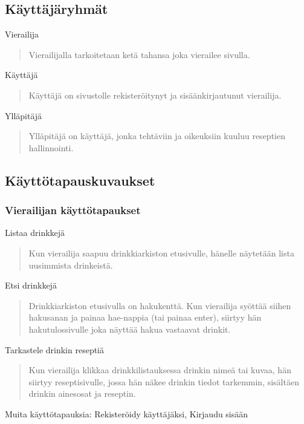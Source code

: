 \documentclass[a4paper]{article}
\begin{document}
\subsection{Käyttäjäryhmät}
Vierailija
\begin{quote}
  Vierailijalla tarkoitetaan ketä tahansa joka vierailee sivulla.
\end{quote}
Käyttäjä
\begin{quote}
  Käyttäjä on sivustolle rekisteröitynyt ja sisäänkirjautunut vierailija.
\end{quote}
Ylläpitäjä
\begin{quote}
  Ylläpitäjä on käyttäjä, jonka tehtäviin ja oikeuksiin kuuluu reseptien hallinnointi.
\end{quote}

\subsection{Käyttötapauskuvaukset}
\subsubsection{Vierailijan käyttötapaukset}
Listaa drinkkejä
\begin{quote}
  Kun vierailija saapuu drinkkiarkiston etusivulle, hänelle näytetään lista uusimmista drinkeistä.
\end{quote}
Etsi drinkkejä
\begin{quote}
  Drinkkiarkiston etusivulla on hakukenttä. Kun vierailija syöttää siihen hakusanan ja painaa hae-nappia (tai painaa enter), siirtyy hän hakutulossivulle joka näyttää hakua vastaavat drinkit.
\end{quote}
Tarkastele drinkin reseptiä
\begin{quote}
  Kun vierailija klikkaa drinkkilistauksessa drinkin nimeä tai kuvaa, hän siirtyy reseptisivulle, jossa hän näkee drinkin tiedot tarkemmin, sisältäen drinkin ainesosat ja reseptin.
\end{quote}
Muita käyttötapauksia: Rekisteröidy käyttäjäksi, Kirjaudu sisään
\end{document}
